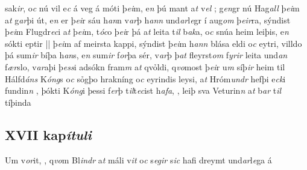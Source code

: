 sak\textit{ir}, o\textit{c} nú vil e\textit{c}  á  veg á móti þ\textit{ei}m, e\textit{n} þú mant   a\textit{t} v\textit{el} ; g\textit{en}gr  nú Hag\textit{all}  þ\textit{ei}m a\textit{t} g\textit{ar}þi út, e\textit{n} er þ\textit{ei}r
sáu h\textit{an}n  v\textit{ar}þ h\textit{ann}
und\textit{ar}l\textit{e}gr í aug\textit{om} þ\textit{eir}ra, sýndist þ\textit{ei}m   Flugdr\textit{ec}i   a\textit{t} þ\textit{ei}m, t\textit{óc}o þ\textit{ei}r þá a\textit{t}
leita   t\textit{il} b\textit{ak}a, o\textit{c} snúa heim leiþis, e\textit{n}  sókti eptir || þ\textit{ei}m af meirsta kappi, sýndist þ\textit{ei}m h\textit{ann}
blása eldi  o\textit{c} eytri, villdo þá sum\textit{ir} bíþa
h\textit{an}s, e\textit{n} sum\textit{ir} f\textit{or}þa sér, v\textit{ar}þ
þ\textit{at}  fleyrst\textit{om} f\textit{yrir}  leita   und\textit{an} f\textit{ær}slo, v\textit{ar}aþi þ\textit{ess}i adsókn fram\textit{m} a\textit{t} qvỏldi, q\textit{vo}most
þ\textit{ei}r   u\textit{m} síþ\textit{ir} heim til  Hálfd\textit{áns}
K\textit{óng}s o\textit{c} sỏgþo    hrakníng  o\textit{c} eyrindis
leysi,  a\textit{t} Hróm\textit{undr} hefþi e\textit{ck}i
fundin\textit{n} , þókti   K\textit{óng}i þessi  f\textit{er}þ   t\textit{il}t\textit{ec}ist h\textit{afa},  , leiþ sva   Veturin\textit{n} a\textit{t}  b\textit{ar} t\textit{il} tíþinda 
\pend\endnumbering  
\beginnumbering\pstart  
\vspace{5mm}\subsection*{XVII kap\textit{ítuli}}  Um v\textit{or}it, , q\textit{vo}m Bl\textit{indr} a\textit{t} máli v\textit{it}   o\textit{c} s\textit{egir}  s\textit{ic} hafi   dreymt  und\textit{ar}l\textit{e}ga á
